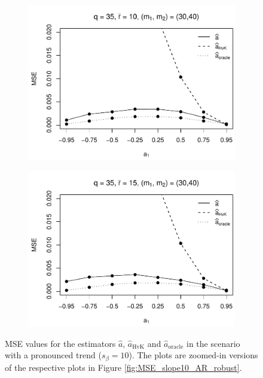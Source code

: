 \begin{figure}[p]
\begin{subfigure}[b]{0.45\textwidth}
\includegraphics[width=\textwidth]{Plots/Robustness/MSE_a1_zoomed_T=500_slope=10_(q,r,M1,M2)=(35,10,30,40).pdf}
\end{subfigure}
\hspace{0.25cm}
\begin{subfigure}[b]{0.45\textwidth}
\includegraphics[width=\textwidth]{Plots/Robustness/MSE_a1_zoomed_T=500_slope=10_(q,r,M1,M2)=(35,15,30,40).pdf}
\end{subfigure}
\caption{MSE values for the estimators $\widehat{a}$, $\widehat{a}_{\text{HvK}}$ and $\widehat{a}_{\text{oracle}}$ in the scenario with a pronounced trend ($s_\beta=10$). The plots are zoomed-in versions of the respective plots in Figure \ref{fig:MSE_slope10_AR_robust}.}\label{fig:MSE_slope10_AR_zoom_robust}
\end{figure}


